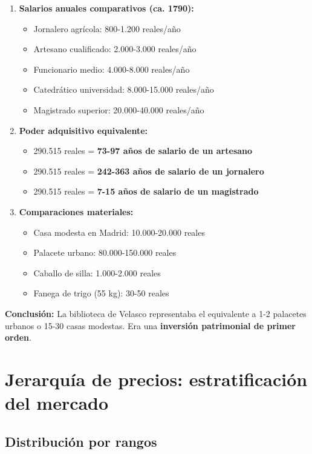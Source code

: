 \documentclass[12pt,a4paper]{article}
\begin{document}
\begin{enumerate}
    \item \textbf{Salarios anuales comparativos (ca. 1790):}
    \begin{itemize}
        \item Jornalero agrícola: 800-1.200 reales/año
        \item Artesano cualificado: 2.000-3.000 reales/año
        \item Funcionario medio: 4.000-8.000 reales/año
        \item Catedrático universidad: 8.000-15.000 reales/año
        \item Magistrado superior: 20.000-40.000 reales/año
    \end{itemize}

    \item \textbf{Poder adquisitivo equivalente:}
    \begin{itemize}
        \item 290.515 reales = \textbf{73-97 años de salario de un artesano}
        \item 290.515 reales = \textbf{242-363 años de salario de un jornalero}
        \item 290.515 reales = \textbf{7-15 años de salario de un magistrado}
    \end{itemize}

    \item \textbf{Comparaciones materiales:}
    \begin{itemize}
        \item Casa modesta en Madrid: 10.000-20.000 reales
        \item Palacete urbano: 80.000-150.000 reales
        \item Caballo de silla: 1.000-2.000 reales
        \item Fanega de trigo (55 kg): 30-50 reales
    \end{itemize}
\end{enumerate}

\textbf{Conclusión:} La biblioteca de Velasco representaba el equivalente a 1-2 palacetes urbanos o 15-30 casas modestas. Era una \textbf{inversión patrimonial de primer orden}.

\section{Jerarquía de precios: estratificación del mercado}

\subsection{Distribución por rangos}
\end{document}
